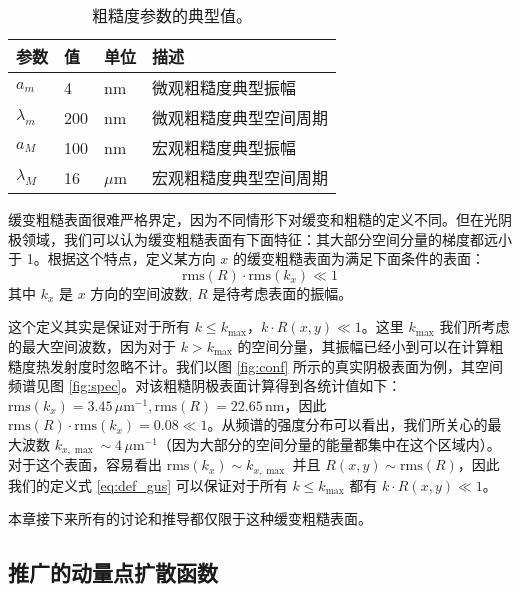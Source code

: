 \begin{table}[htbp]
\caption{\label{tab:rough}
粗糙度参数的典型值。}
\centering
\begin{tabular}{llll}
\toprule
参数 & 值 & 单位 & 描述 \\
\midrule
$a_m$ & 4 & nm & 微观粗糙度典型振幅 \\
$\lambda_m$ & 200 & nm & 微观粗糙度典型空间周期 \\
$a_M$ & 100 & nm & 宏观粗糙度典型振幅 \\
$\lambda_M$ & 16 & $\mu$m & 宏观粗糙度典型空间周期 \\
\bottomrule
\end{tabular}
\end{table}

缓变粗糙表面很难严格界定，因为不同情形下对缓变和粗糙的定义不同。但在光阴极领域，我们可以认为缓变粗糙表面有下面特征：其大部分空间分量的梯度都远小于 1。根据这个特点，定义某方向 $x$ 的缓变粗糙表面为满足下面条件的表面：
\begin{equation}
\text{rms}(R)\cdot\text{rms}(k_x) \ll 1
\label{eq:def_gus}
\end{equation}
其中 $k_x$ 是 $x$ 方向的空间波数, $R$ 是待考虑表面的振幅。 

这个定义其实是保证对于所有 $k \le k_{\max}$，$k\cdot R(x, y) \ll 1$。这里 $k_{\max}$ 我们所考虑的最大空间波数，因为对于 $k > k_{\max}$ 的空间分量，其振幅已经小到可以在计算粗糙度热发射度时忽略不计。我们以图 \ref{fig:conf} 所示的真实阴极表面为例，其空间频谱见图 \ref{fig:spec}。对该粗糙阴极表面计算得到各统计值如下：$\text{rms}(k_x)=3.45\,\mu\text{m}^{-1}, \text{rms}(R)=22.65\,\text{nm}$，因此 $\text{rms}(R)\cdot\text{rms}(k_x) = 0.08 \ll 1$。从频谱的强度分布可以看出，我们所关心的最大波数 $k_{x, \max}\sim 4\,\mu\text{m}^{-1}$（因为大部分的空间分量的能量都集中在这个区域内）。对于这个表面，容易看出 $\text{rms}(k_x)\sim k_{x, \max}$ 并且 $R(x, y)\sim\text{rms}(R)$，因此我们的定义式 \ref{eq:def_gus} 可以保证对于所有 $k \le k_{\max}$ 都有 $k\cdot R(x, y) \ll 1$。

本章接下来所有的讨论和推导都仅限于这种缓变粗糙表面。

\subsection{\label{ss:gmpsf}推广的动量点扩散函数}

